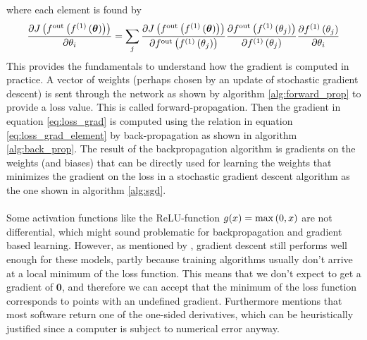 where each element is found by
\begin{equation} \label{eq:loss_grad_element}
    \frac{\partial J\left (f^{\text{out}} \left (f^{(1)}\left (\boldsymbol{\theta}\right)\right)\right)}{\partial \theta_i} = \sum_j \frac{\partial J\left (f^{\text{out}} \left (f^{(1)}\left (\boldsymbol{\theta}\right)\right)\right)}{\partial f^{\text{out}} \left (f^{(1)}\left (\theta_j\right)\right)} 
    \frac{\partial f^{\text{out}} \left (f^{(1)}\left (\theta_j\right)\right)}{\partial f^{(1)}\left (\theta_j\right)} 
    \frac{\partial f^{(1)}\left (\theta_j\right)}{\partial \theta_i}
\end{equation}
This provides the fundamentals to understand how the gradient is computed in practice.
A vector of weights (perhaps chosen by an update of stochastic gradient descent) is sent through the network as shown by algorithm \ref{alg:forward_prop} to provide a loss value. This is called forward-propagation. Then the gradient in equation \ref{eq:loss_grad} is computed using the relation in equation \ref{eq:loss_grad_element} by back-propagation as shown in algorithm \ref{alg:back_prop}. The result of the backpropagation algorithm is gradients on the weights (and biases) that can be directly used for learning the weights that minimizes the gradient on the loss in a stochastic gradient descent algorithm as the one shown in algorithm \ref{alg:sgd}.\\
\\
Some activation functions like the ReLU-function $g(x) = \max \left (0, x\right)$ are not differential, which might sound problematic for backpropagation and gradient based learning. However, as mentioned by \cite{Goodfellow-et-al-2016}, gradient descent still performs well enough for these models, partly because training algorithms usually don't arrive at a local minimum of the loss function. This means that we don't expect to get a gradient of $\boldsymbol{0}$, and therefore we can accept that the minimum of the loss function corresponds to points with an undefined gradient. Furthermore \cite{Goodfellow-et-al-2016} mentions that most software return one of the one-sided derivatives, which can be heuristically justified since a computer is subject to numerical error anyway. \\
\\

